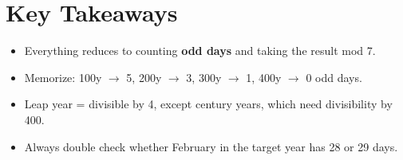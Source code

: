 \documentclass[11pt]{article}
\begin{document}
\section{Key Takeaways}
\begin{itemize}[leftmargin=1.4em]
  \item Everything reduces to counting \textbf{odd days} and taking the result mod 7.
  \item Memorize: 100y $\to$ 5, 200y $\to$ 3, 300y $\to$ 1, 400y $\to$ 0 odd days.
  \item Leap year = divisible by 4, except century years, which need divisibility by 400.
  \item Always double check whether February in the target year has 28 or 29 days.
\end{itemize}
\end{document}
